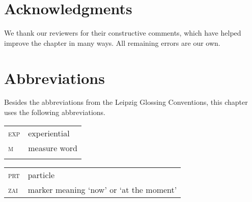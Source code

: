 \documentclass[output=paper,chinesefont,hidelinks]{langscibook}
\begin{document}
\section*{Acknowledgments}

We thank our reviewers for their constructive comments, which have helped improve the chapter in many ways. All remaining errors are our own.

\section*{Abbreviations}

Besides the abbreviations from the Leipzig Glossing Conventions, this
chapter uses the following abbreviations.\medskip

\noindent\begin{tabularx}{.45\textwidth}{lQ}
\textsc{exp} & 		experiential \\
\textsc{m} &		measure word\\
\quad
\end{tabularx}
\begin{tabularx}{.45\textwidth}{lQ}
\textsc{prt} &		particle\\
\textsc{zai} &		marker meaning `now' or `at the moment'\\
\end{tabularx}

\sloppy
\printbibliography[heading=subbibliography,notkeyword=this]
\end{document}
